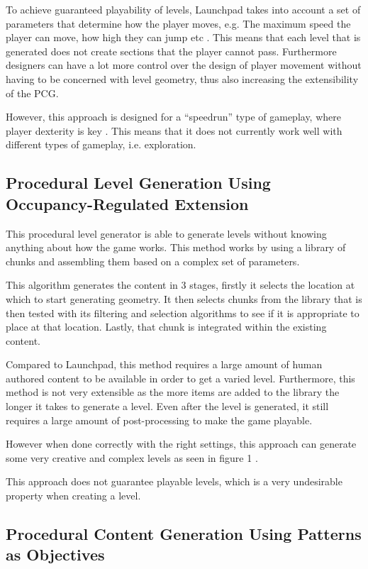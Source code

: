 \documentclass{scrartcl}
\begin{document}
To achieve guaranteed playability of levels, Launchpad takes into account a set of parameters that determine how the player moves, e.g. The maximum speed the player can move, how high they can jump etc \cite{smith2012web}. This means that each level that is generated does not create sections that the player cannot pass. Furthermore designers can have a lot more control over the design of player movement without having to be concerned with level geometry, thus also increasing the extensibility of the PCG.


However, this approach is designed for a ``speedrun''  type of gameplay, where player dexterity is key \cite{smith2009}. This means that it does not currently work well with different types of gameplay, i.e. exploration.


\subsection{Procedural Level Generation Using Occupancy-Regulated Extension}

This procedural level generator is able to generate levels without knowing anything about how the game works. This method works by using a library of chunks and assembling them based on a complex set of parameters. 

This algorithm generates the content in 3 stages, firstly it selects the location at which to start generating geometry. It then selects chunks from the library that is then tested with its filtering and selection algorithms to see if it is appropriate to place at that location. Lastly, that chunk is integrated within the existing content.

Compared to Launchpad, this method requires a large amount of human authored content to be available in order to get a varied level. Furthermore, this method is not very extensible as the more items are added to the library the longer it takes to generate a level. Even after the level is generated, it still requires a large amount of post-processing to make the game playable.

However when done correctly with the right settings, this approach can generate some very creative and complex levels as seen in figure 1 .

This approach does not guarantee playable levels, which is a very undesirable property when creating a level.



\subsection{Procedural Content Generation Using Patterns as Objectives}
\end{document}
